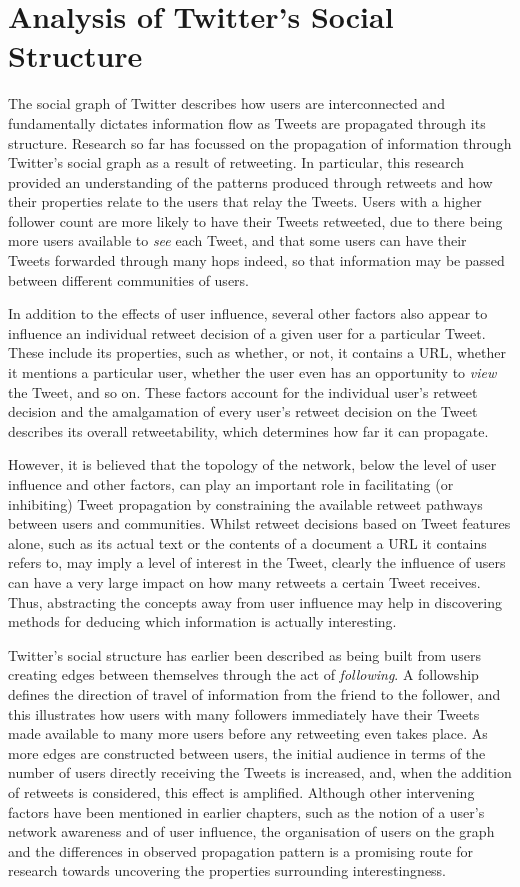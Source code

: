 \chapter{Analysis of Twitter's Social Structure}

The social graph of Twitter describes how users are interconnected and fundamentally dictates information flow as Tweets are propagated through its structure. Research so far has focussed on the propagation of information through Twitter's social graph as a result of retweeting. In particular, this research provided an understanding of the patterns produced through retweets and how their properties relate to the users that relay the Tweets. Users with a higher follower count are more likely to have their Tweets retweeted, due to there being more users available to \textit{see} each Tweet, and that some users can have their Tweets forwarded through many hops indeed, so that information may be passed between different communities of users.

In addition to the effects of user influence,  several other factors also appear to influence an individual retweet decision of a given user for a particular Tweet. These include its properties, such as whether, or not, it contains a URL, whether it mentions a particular user, whether the user even has an opportunity to \textit{view} the Tweet, and so on. These factors account for the individual user's retweet decision and the amalgamation of every user's retweet decision on the Tweet describes its overall retweetability, which determines how far it can propagate.

However, it is believed that the topology of the network, below the level of user influence and other factors, can play an important role in facilitating (or inhibiting) Tweet propagation by constraining the available retweet pathways between users and communities. Whilst retweet decisions based on Tweet features alone, such as its actual text or the contents of a document a URL it contains refers to, may imply a level of interest in the Tweet, clearly the influence of users can have a very large impact on how many retweets a certain Tweet receives. Thus, abstracting the concepts away from user influence may help in discovering methods for deducing which information is actually interesting.

Twitter's social structure has earlier been described as being built from users creating edges between themselves through the act of \textit{following}. A followship defines the direction of travel of information from the friend to the follower, and this illustrates how users with many followers immediately have their Tweets made available to many more users before any retweeting even takes place. As more edges are constructed between users, the initial audience in terms of the number of users directly receiving the Tweets is increased, and, when the addition of retweets is considered, this effect is amplified. Although other intervening factors have been mentioned in earlier chapters, such as the notion of a user's network awareness and of user influence, the organisation of users on the graph and the differences in observed propagation pattern is a promising route for research towards uncovering the properties surrounding interestingness.

